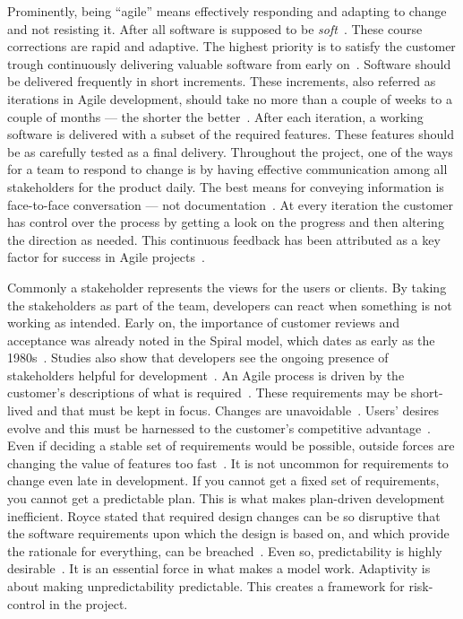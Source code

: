 \documentclass[english]{tktltiki2}
\begin{document}
Prominently, being “agile” means effectively responding and adapting to change and not resisting it. After all software is supposed to be \emph{soft}~\cite{Fow05}. These course corrections are rapid and adaptive. The highest priority is to satisfy the customer trough continuously delivering valuable software from early on~\cite{BBB01b}. Software should be delivered frequently in short increments. These increments, also referred as iterations in Agile development, should take no more than a couple of weeks to a couple of months — the shorter the better~\cite{Fow05}. After each iteration, a working software is delivered with a subset of the required features. These features should be as carefully tested as a final delivery. Throughout the project, one of the ways for a team to respond to change is by having effective communication among all stakeholders for the product daily. The best means for conveying information is face-to-face conversation — not documentation~\cite{BBB01b}. At every iteration the customer has control over the process by getting a look on the progress and then altering the direction as needed. This continuous feedback has been attributed as a key factor for success in Agile projects~\cite{DD08}.

Commonly a stakeholder represents the views for the users or clients. By taking the stakeholders as part of the team, developers can react when something is not working as intended. Early on, the importance of customer reviews and acceptance was already noted in the Spiral model, which dates as early as the 1980s~\cite{Boe88}. Studies also show that developers see the ongoing presence of stakeholders helpful for development~\cite{DD08}. An Agile process is driven by the customer’s descriptions of what is required~\cite{BBB01b}. These requirements may be short-lived and that must be kept in focus. Changes are unavoidable~\cite{Fow05}. Users’ desires evolve and this must be harnessed to the customer’s competitive advantage~\cite{BBB01b, Fow05}. Even if deciding a stable set of requirements would be possible, outside forces are changing the value of features too fast~\cite{Fow05}. It is not uncommon for requirements to change even late in development. If you cannot get a fixed set of requirements, you cannot get a predictable plan. This is what makes plan-driven development inefficient. Royce stated that required design changes can be so disruptive that the software requirements upon which the design is based on, and which provide the rationale for everything, can be breached~\cite{Roy70}. Even so, predictability is highly desirable~\cite{Fow05}. It is an essential force in what makes a model work. Adaptivity is about making unpredictability predictable. This creates a framework for risk-control in the project.
\end{document}
